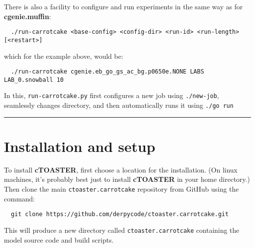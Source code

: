 \documentclass[a4paper,10pt,article]{memoir}
\begin{document}
There is also a facility to configure and run experiments in the same way as for \textbf{cgenie.muffin}:
\begin{verbatim}
  ./run-carrotcake <base-config> <config-dir> <run-id> <run-length> [<restart>]
\end{verbatim}
which for the example above, would be:
\begin{verbatim}
  ./run-carrotcake cgenie.eb_go_gs_ac_bg.p0650e.NONE LABS LAB_0.snowball 10
\end{verbatim}
In this, \texttt{run-carrotcake.py} first configures a new job using \texttt{./new-job},
seamlessly changes directory, and then automatically runs it using \texttt{./go run}

\vspace{1mm}\noindent\rule{4cm}{0.5pt}\vspace{2mm}

\newpage

\section{Installation and setup}

To install \textbf{cTOASTER}, first choose a location for the installation. (On linux machines, it's probably best just to install \textbf{cTOASTER} in your home directory.) Then clone the main \texttt{ctoaster.carrotcake} repository from GitHub
using the command:
\begin{verbatim}
  git clone https://github.com/derpycode/ctoaster.carrotcake.git
\end{verbatim}
This will produce a new directory called \texttt{ctoaster.carrotcake} containing the model source code and build scripts.
\end{document}
